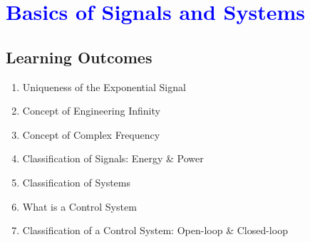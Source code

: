 \documentclass[../notes-main.tex]{subfiles}
\begin{document}
\chapter{\textcolor{blue}{Basics of Signals and Systems}}
\section*{Learning Outcomes}
\begin{enumerate}[label=\blacktriangleright, leftmargin=*, itemsep=0.5em]
    \item Uniqueness of the Exponential Signal
    \item Concept of Engineering Infinity
    \item Concept of Complex Frequency
    \item Classification of Signals: Energy \& Power
    \item Classification of Systems
    \item What is a Control System
    \item Classification of a Control System: Open-loop \& Closed-loop
\end{enumerate}
\newpage



\newpage

\newpage

\end{document}
